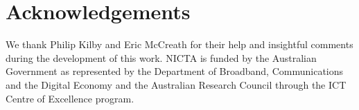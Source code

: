 \section{Acknowledgements}
We thank Philip Kilby and Eric McCreath for their help and insightful comments during the development of this work.
NICTA is funded by the Australian Government as represented by the Department of 
Broadband, Communications and the Digital Economy and the Australian Research 
Council through the ICT Centre of Excellence program.

